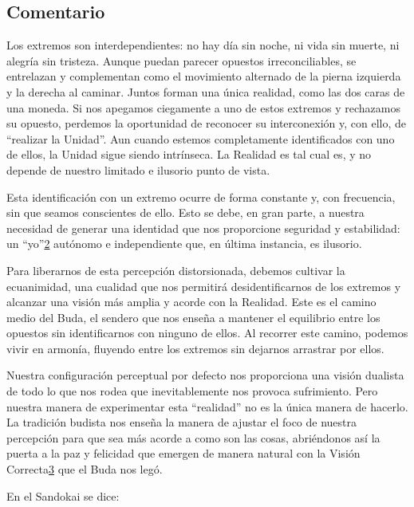\documentclass[
  a5paperpaper,
]{article}
\begin{document}
\hfill\break

\hypertarget{comentario-11}{%
\subsection{Comentario}\label{comentario-11}}

Los extremos son interdependientes: no hay día sin noche, ni vida sin
muerte, ni alegría sin tristeza. Aunque puedan parecer opuestos
irreconciliables, se entrelazan y complementan como el movimiento
alternado de la pierna izquierda y la derecha al caminar. Juntos forman
una única realidad, como las dos caras de una moneda. Si nos apegamos
ciegamente a uno de estos extremos y rechazamos su opuesto, perdemos la
oportunidad de reconocer su interconexión y, con ello, de ``realizar la
Unidad''. Aun cuando estemos completamente identificados con uno de
ellos, la Unidad sigue siendo intrínseca. La Realidad es tal cual es, y
no depende de nuestro limitado e ilusorio punto de vista.

Esta identificación con un extremo ocurre de forma constante y, con
frecuencia, sin que seamos conscientes de ello. Esto se debe, en gran
parte, a nuestra necesidad de generar una identidad que nos proporcione
seguridad y estabilidad: un
``yo''\protect\hypertarget{ref2}{\protect\hyperlink{nota2}{2}} autónomo
e independiente que, en última instancia, es ilusorio.

Para liberarnos de esta percepción distorsionada, debemos cultivar la
ecuanimidad, una cualidad que nos permitirá desidentificarnos de los
extremos y alcanzar una visión más amplia y acorde con la Realidad. Este
es el camino medio del Buda, el sendero que nos enseña a mantener el
equilibrio entre los opuestos sin identificarnos con ninguno de ellos.
Al recorrer este camino, podemos vivir en armonía, fluyendo entre los
extremos sin dejarnos arrastrar por ellos.

Nuestra configuración perceptual por defecto nos proporciona una visión
dualista de todo lo que nos rodea que inevitablemente nos provoca
sufrimiento. Pero nuestra manera de experimentar esta ``realidad'' no es
la única manera de hacerlo. La tradición budista nos enseña la manera de
ajustar el foco de nuestra percepción para que sea más acorde a como son
las cosas, abriéndonos así la puerta a la paz y felicidad que emergen de
manera natural con la Visión
Correcta\protect\hypertarget{ref3}{\protect\hyperlink{nota3}{3}} que el
Buda nos legó.

En el Sandokai se dice:
\end{document}
